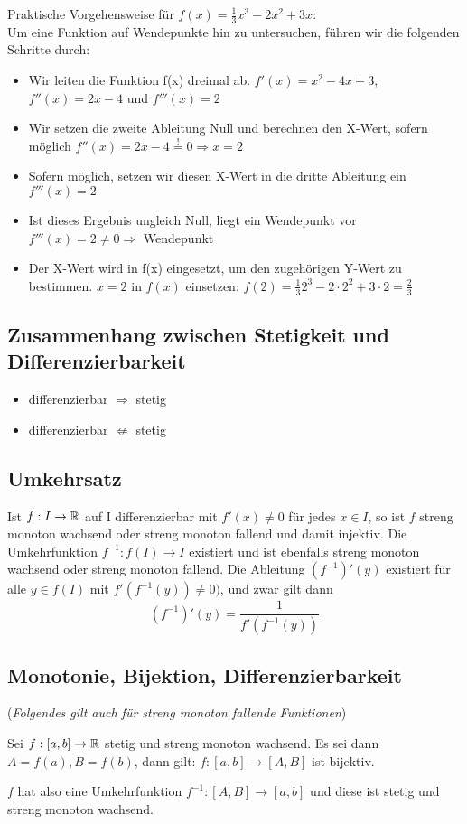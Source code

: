 Praktische Vorgehensweise für $f(x) = \frac{1}{3}x^3-2x^2+3x$:\\
Um eine Funktion auf Wendepunkte hin zu untersuchen, führen wir die folgenden Schritte durch:
\begin{itemize}
	\item Wir leiten die Funktion f(x) dreimal ab. $f'(x) = x^2-4x+3$, $f''(x) = 2x-4$ und $f'''(x) = 2$
	\item Wir setzen die zweite Ableitung Null und berechnen den X-Wert, sofern möglich  
		$f''(x) = 2x-4 \stackrel{!}{=} 0 \Rightarrow x = 2$ 
	\item Sofern möglich, setzen wir diesen X-Wert in die dritte Ableitung ein
		$f'''(x) = 2$
	\item Ist dieses Ergebnis ungleich Null, liegt ein Wendepunkt vor
		$f'''(x) = 2 \not= 0 \Rightarrow$ Wendepunkt
	\item Der X-Wert wird in f(x) eingesetzt, um den zugehörigen Y-Wert zu bestimmen.
		$x = 2$ in $f(x)$ einsetzen: $f(2) = \frac{1}{3}2^3-2\cdot2^2+3\cdot2 = \frac{2}{3}$
\end{itemize}

\subsection{Zusammenhang zwischen Stetigkeit und Differenzierbarkeit}
\begin{itemize}
	\item differenzierbar $\Rightarrow$ stetig
	\item differenzierbar $\not\Leftarrow$ stetig
\end{itemize}

\subsection{Umkehrsatz}
Ist $f:I \to \mathbb{R}$ auf I differenzierbar mit $f'(x) \neq 0$ für jedes $x \in I$,
so ist $f$ streng monoton wachsend oder streng monoton fallend und damit
injektiv. Die Umkehrfunktion $f^{-1}:f(I) \to I$ existiert und ist ebenfalls
streng monoton wachsend oder streng monoton fallend. Die Ableitung
$(f^{-1})'(y)$ existiert für alle $y \in f(I)$ mit $f'(f^{-1}(y)) \neq 0)$, und zwar gilt dann \[ (f^{-1})'(y) = \frac{1}{f'(f^{-1}(y))}
\]

\subsection{Monotonie, Bijektion, Differenzierbarkeit}
\begin{satz}
(\textit{Folgendes gilt auch für streng monoton fallende Funktionen})

Sei $f: [a, b] \to \mathbb{R}$ stetig und streng monoton wachsend. Es sei dann
$A = f(a), B = f(b)$, dann gilt: $f: [a,b] \to [A, B]$ ist bijektiv.

$f$ hat also eine Umkehrfunktion $f^{-1}: [A,B] \to [a,b]$ und diese ist stetig
und streng monoton wachsend.
\end{satz}

